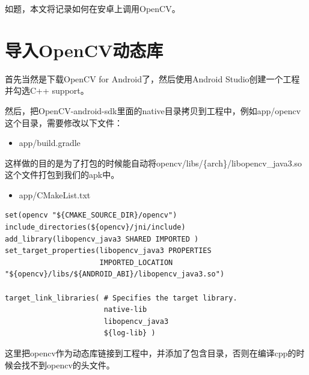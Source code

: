\documentclass[12pt]{article}
\begin{document}
\makeblogtitle

如题，本文将记录如何在安卓上调用OpenCV。

\section{导入OpenCV动态库}\label{ux5bfcux5165opencvux52a8ux6001ux5e93}

首先当然是下载OpenCV for Android了，然后使用Android Studio创建一个工程并勾选C++ support。

然后，把OpenCV-android-sdk里面的native目录拷贝到工程中，例如app/opencv这个目录，需要修改以下文件：

\begin{itemize}
\tightlist
\item
  app/build.gradle
\end{itemize}

\begin{Shaded}
\begin{Highlighting}[]
\OperatorTok{\{}
 \OperatorTok{\{}
\OperatorTok{\{}
\OperatorTok{=} \OperatorTok{[}\OperatorTok{]}
        \OperatorTok{\}}
    \OperatorTok{\}}
\OperatorTok{\}}
\end{Highlighting}
\end{Shaded}

这样做的目的是为了打包的时候能自动将opencv/libs/\{arch\}/libopencv\_java3.so这个文件打包到我们的apk中。

\begin{itemize}
\tightlist
\item
  app/CMakeList.txt
\end{itemize}

\begin{verbatim}
set(opencv "${CMAKE_SOURCE_DIR}/opencv")
include_directories(${opencv}/jni/include)
add_library(libopencv_java3 SHARED IMPORTED )
set_target_properties(libopencv_java3 PROPERTIES
                      IMPORTED_LOCATION "${opencv}/libs/${ANDROID_ABI}/libopencv_java3.so")

target_link_libraries( # Specifies the target library.
                       native-lib
                       libopencv_java3
                       ${log-lib} )
\end{verbatim}

这里把opencv作为动态库链接到工程中，并添加了包含目录，否则在编译cpp的时候会找不到opencv的头文件。
\end{document}
